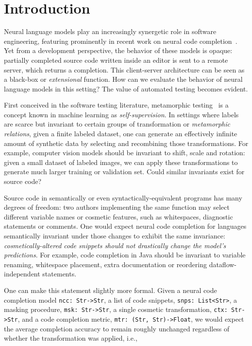 \documentclass[sigconf,review,anonymous]{acmart}
\begin{document}
  \maketitle

  \section{Introduction}\label{sec:introduction}

  Neural language models play an increasingly synergetic role in software engineering, featuring prominently in recent work on neural code completion~\cite{chen2021evaluating}. Yet from a development perspective, the behavior of these models is opaque: partially completed source code written inside an editor is sent to a remote server, which returns a completion. This client-server architecture can be seen as a black-box or \textit{extensional} function. How can we evaluate the behavior of neural language models in this setting? The value of automated testing becomes evident.

  First conceived in the software testing literature, metamorphic testing~\cite{chen1995metamorphic} is a concept known in machine learning as \textit{self-supervision}. In settings where labels are scarce but invariant to certain groups of transformation or \textit{metamorphic relations}, given a finite labeled dataset, one can generate an effectively infinite amount of synthetic data by selecting and recombining those transformations. For example, computer vision models should be invariant to shift, scale and rotation: given a small dataset of labeled images, we can apply these transformations to generate much larger training or validation set. Could similar invariants exist for source code?

  Source code in semantically or even syntactically-equivalent programs has many degrees of freedom: two authors implementing the same function may select different variable names or cosmetic features, such as whitespaces, diagnostic statements or comments. One would expect neural code completion for languages semantically invariant under those changes to exhibit the same invariance: \textit{cosmetically-altered code snippets should not drastically change the model's predictions}. For example, code completion in Java should be invariant to variable renaming, whitespace placement, extra documentation or reordering dataflow-independent statements.

  One can make this statement slightly more formal. Given a neural code completion model \lstinline|ncc: Str->Str|, a list of code snippets, \lstinline|snps: List<Str>|, a masking procedure, \lstinline|msk: Str->Str|, a single cosmetic transformation, \lstinline|ctx: Str->Str|, and a code completion metric, \lstinline|mtr: (Str, Str)->Float|, we would expect the average completion accuracy to remain roughly unchanged regardless of whether the transformation was applied, i.e.,
\end{document}
